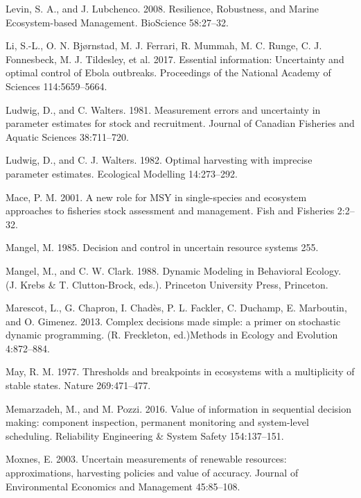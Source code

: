 \documentclass[3p]{elsarticle} %
\begin{document}
\leavevmode\hypertarget{ref-Levin2008}{}%
Levin, S. A., and J. Lubchenco. 2008. Resilience, Robustness, and Marine
Ecosystem-based Management. BioScience 58:27--32.

\leavevmode\hypertarget{ref-Li2017}{}%
Li, S.-L., O. N. Bjørnstad, M. J. Ferrari, R. Mummah, M. C. Runge, C. J.
Fonnesbeck, M. J. Tildesley, et al. 2017. Essential information:
Uncertainty and optimal control of Ebola outbreaks. Proceedings of the
National Academy of Sciences 114:5659--5664.

\leavevmode\hypertarget{ref-Ludwig1981}{}%
Ludwig, D., and C. Walters. 1981. Measurement errors and uncertainty in
parameter estimates for stock and recruitment. Journal of Canadian
Fisheries and Aquatic Sciences 38:711--720.

\leavevmode\hypertarget{ref-Ludwig1982}{}%
Ludwig, D., and C. J. Walters. 1982. Optimal harvesting with imprecise
parameter estimates. Ecological Modelling 14:273--292.

\leavevmode\hypertarget{ref-Mace2001}{}%
Mace, P. M. 2001. A new role for MSY in single-species and ecosystem
approaches to fisheries stock assessment and management. Fish and
Fisheries 2:2--32.

\leavevmode\hypertarget{ref-Mangel1985}{}%
Mangel, M. 1985. Decision and control in uncertain resource systems 255.

\leavevmode\hypertarget{ref-Mangel1988}{}%
Mangel, M., and C. W. Clark. 1988. Dynamic Modeling in Behavioral
Ecology. (J. Krebs \& T. Clutton-Brock, eds.). Princeton University
Press, Princeton.

\leavevmode\hypertarget{ref-Marescot2013}{}%
Marescot, L., G. Chapron, I. Chadès, P. L. Fackler, C. Duchamp, E.
Marboutin, and O. Gimenez. 2013. Complex decisions made simple: a primer
on stochastic dynamic programming. (R. Freckleton, ed.)Methods in
Ecology and Evolution 4:872--884.

\leavevmode\hypertarget{ref-May1977}{}%
May, R. M. 1977. Thresholds and breakpoints in ecosystems with a
multiplicity of stable states. Nature 269:471--477.

\leavevmode\hypertarget{ref-Memarzadeh2016b}{}%
Memarzadeh, M., and M. Pozzi. 2016. Value of information in sequential
decision making: component inspection, permanent monitoring and
system-level scheduling. Reliability Engineering \& System Safety
154:137--151.

\leavevmode\hypertarget{ref-Moxnes2003}{}%
Moxnes, E. 2003. Uncertain measurements of renewable resources:
approximations, harvesting policies and value of accuracy. Journal of
Environmental Economics and Management 45:85--108.
\end{document}
